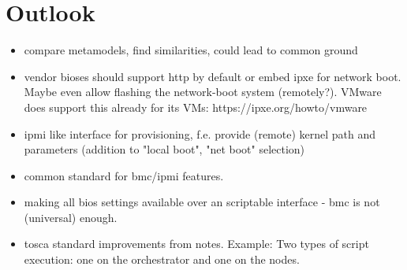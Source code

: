 \chapter{Outlook}



\begin{itemize}
  \item compare metamodels, find similarities, could lead to common ground
  \item vendor bioses should support http by default or embed ipxe for network boot. Maybe even allow flashing the network-boot system (remotely?). VMware does support this already for its VMs: https://ipxe.org/howto/vmware
  \item ipmi like interface for provisioning, f.e. provide (remote) kernel path and parameters (addition to "local boot", "net boot" selection)
  \item common standard for bmc/ipmi features.
  \item making all bios settings available over an scriptable interface - bmc is not (universal) enough.
  \item tosca standard improvements from notes. Example: Two types of script execution: one on the orchestrator and one on the nodes.
\end{itemize}
